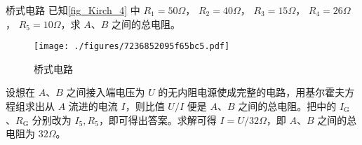 \begin{example}{桥式电路}
已知\autoref{fig_Kirch_4} 中 $R_{1}=50 \Omega$， $ R_{2}=40 \Omega$， $ R_{3}=15 \Omega$， $ R_{4}=26 \Omega$， $ R_{5}=10 \Omega$，求 $A $、$B $ 之间的总电阻。
\begin{figure}[ht]
\centering
\texttt{[image: ./figures/7236852095f65bc5.pdf]}
\caption{桥式电路} \label{fig_Kirch_4}
\end{figure}

设想在 $A $、$B $ 之间接入端电压为 $U $ 的无内阻电源使成完整的电路，用基尔霍夫方程组求出从 $A $ 流进的电流 $I$，则比值 $U/I$ 便是 $A$、$B$ 之间的总电阻。把中的 $I_\mathrm{G}$、$R_\mathrm{G}$ 分别改为 $I_5,R_5$，即可得出答案。求解可得 $I=U/32\Omega$，即 $A$、$B$ 之间的总电阻为 $32\Omega$。
\end{example}
